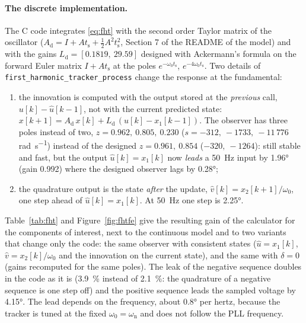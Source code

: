 \documentclass[11pt,a4paper]{scrartcl}
\newcommand{\ped}[1]{_{\mathrm{#1}}}
\newcommand{\code}[1]{\texttt{#1}}
\begin{document}
\begin{onehalfspace}
\paragraph{The discrete implementation.} The C code integrates \eqref{eq:fht} with the second order Taylor matrix of the oscillator ($A\ped{d} = I + A t\ped{s} + \tfrac12 A^2 t\ped{s}^2$, Section 7 of the README of the model) and with the gains $L\ped{d} = [0.1819,\ 29.59]$ designed with Ackermann's formula on the forward Euler matrix $I + A t\ped{s}$ at the poles $e^{-\omega_0 t\ped{s}}$, $e^{-4\omega_0 t\ped{s}}$. Two details of \code{first\_harmonic\_tracker\_process} change the response at the fundamental:
\begin{enumerate}[nosep]
	\item the innovation is computed with the output stored at the \emph{previous} call, $u[k] - \hat u[k-1]$, not with the current predicted state: $x[k+1] = A\ped{d}\, x[k] + L\ped{d}\,(u[k] - x_1[k-1])$. The observer has three poles instead of two, $z = 0.962,\ 0.805,\ 0.230$ ($s = -312,\ -1733,\ -11\,776$ \si{\radian\per\second}) instead of the designed $z = 0.961,\ 0.854$ ($-320,\ -1264$): still stable and fast, but the output $\hat u[k] = x_1[k]$ now \emph{leads} a \SI{50}{\hertz} input by \ang{1.96} (gain \num{0.992}) where the designed observer lags by \ang{0.28};
	\item the quadrature output is the state \emph{after} the update, $\hat v[k] = x_2[k+1]/\omega_0$, one step ahead of $\hat u[k] = x_1[k]$. At \SI{50}{\hertz} one step is \ang{2.25}.
\end{enumerate}
Table~\ref{tab:fht} and Figure~\ref{fig:fhtfe} give the resulting gain of the calculator for the components of interest, next to the continuous model and to two variants that change only the code: the same observer with consistent states ($\hat u = x_1[k]$, $\hat v = x_2[k]/\omega_0$ and the innovation on the current state), and the same with $\delta = 0$ (gains recomputed for the same poles). The leak of the negative sequence doubles in the code as it is (\num{3.9}~\% instead of \num{2.1}~\%: the quadrature of a negative sequence is one step off) and the positive sequence leads the sampled voltage by \ang{4.15}. The lead depends on the frequency, about \ang{0.8} per hertz, because the tracker is tuned at the fixed $\omega_0 = \omega\ped{n}$ and does not follow the PLL frequency.


\end{onehalfspace}
\end{document}
